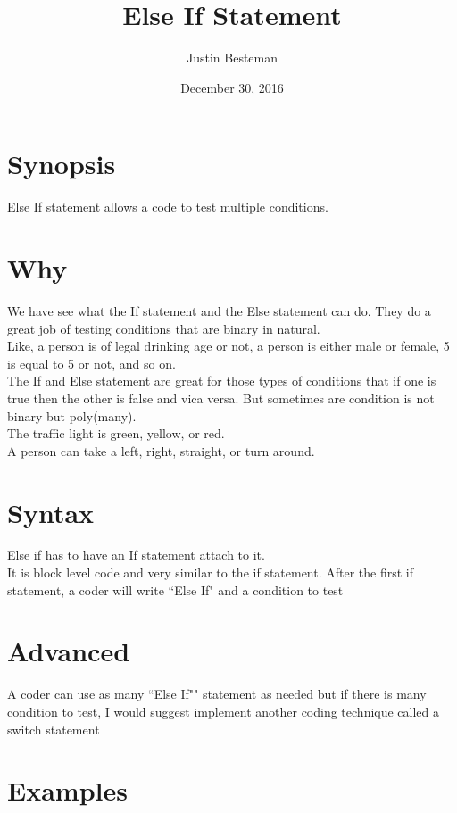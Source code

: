 \documentclass[12pt, letterpaper]{article}
\title{Else If Statement}
\author{Justin Besteman}
\date{December 30, 2016}
\begin{document}
\maketitle


\section*{Synopsis}

Else If statement allows a code to test multiple conditions.

\section*{Why}

We have see what the If statement and the Else statement can do. They do a great job of testing conditions that are binary in natural.\\
Like, a person is of legal drinking age or not, a person is either male or female, 5 is equal to 5 or not, and so on. \\
The If and Else statement are great for those types of conditions that if one is true then the other is false and vica versa.
But sometimes are condition is not binary but poly(many). \\
The traffic light is green, yellow, or red.\\
A person can take a left, right, straight, or turn around. \\

\section*{Syntax}

Else if has to have an If statement attach to it.\\
It is block level code and very similar to the if statement. After the first if statement, a coder will write ``Else If" and a condition to test

\section*{Advanced}

A coder can use as many ``Else If"" statement as needed but if there is many condition to test, I would suggest implement another coding technique called a switch statement

\section*{Examples}
\end{document}
